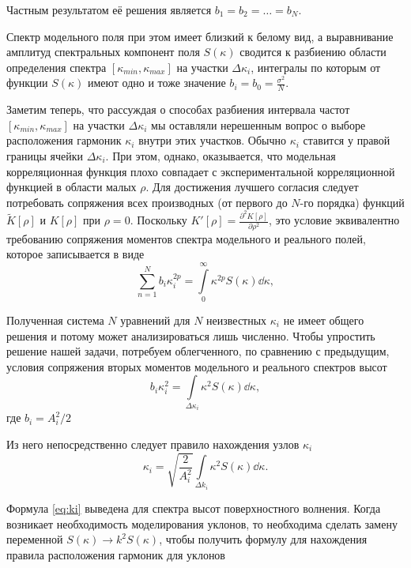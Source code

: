 \documentclass[a4paper,14pt]{extarticle}
\newcommand{\tK}{\widetilde K}
\begin{document}
Частным результатом её решения является $b_1 = b_2 = \dots = b_N$.

Спектр модельного поля при этом имеет близкий к белому вид, а выравнивание
амплитуд спектральных компонент поля $S(\kappa)$ сводится к разбиению области
определения спектра $[\kappa_{min},\kappa_{max}]$ на участки $\Delta
\kappa_i$, интегралы по
которым от функции  $S(\kappa)$ имеют одно и тоже значение $b_i = b_{0} =
\frac{\sigma^2}{N}$.

Заметим теперь, что рассуждая о способах разбиения интервала частот
$[\kappa_{min},
\kappa_{max}]$ на участки $\Delta \kappa_i$ мы оставляли нерешенным вопрос о выборе
расположения гармоник $\kappa_i$ внутри этих участков. Обычно  $\kappa_i$ ставится у
правой границы ячейки  $\Delta \kappa_i$. При этом, однако, оказывается, что
модельная корреляционная функция плохо совпадает с экспериментальной
корреляционной функцией в области малых  $\rho$. Для достижения лучшего
согласия следует потребовать сопряжения всех производных (от первого до $N$-го
порядка) функций $\tK[\rho]$ и  $K[\rho]$ при  $\rho=0$. 
Поскольку $K'[\rho] = \frac{\partial^2 K[\rho]}{\partial \rho^2}$, это условие эквивалентно
требованию сопряжения моментов спектра модельного и реального полей, которое
записывается в виде
 \begin{equation}
    \sum\limits_{n=1}^{N} b_i \kappa_i^{2p} 
    = \int\limits_{0}^{\infty} \kappa^{2p}S(\kappa) \dd \kappa, 
\end{equation}

Полученная система $N$ уравнений для $N$ неизвестных $\kappa_i$ не имеет общего
решения и потому может анализироваться лишь численно. Чтобы упростить решение
нашей задачи, потребуем облегченного, по сравнению с предыдущим, условия
сопряжения вторых моментов модельного и реального спектров высот
 \begin{equation}
    b_i \kappa_i^2 = \int\limits_{\Delta \kappa_i} \kappa^2 S(\kappa) \dd \kappa,
\end{equation}
где $b_i= A_i^2 / 2$

Из него непосредственно следует правило нахождения узлов $\kappa_i$ 
\begin{equation}
    \label{eq:ki}
    \boxed{
        \kappa_i = \sqrt{\frac{2}{A_{i}^2}} \int\limits_{\Delta k_i} \kappa^2
        S(\kappa) \dd \kappa. 
    }
\end{equation}

Формула \eqref{eq:ki} выведена для спектра высот поверхностного волнения. Когда
возникает необходимость моделирования уклонов, то необходима сделать замену
переменной $S(\kappa) \to k^2 S(\kappa)$, чтобы получить формулу для нахождения правила
расположения гармоник для уклонов
\end{document}

